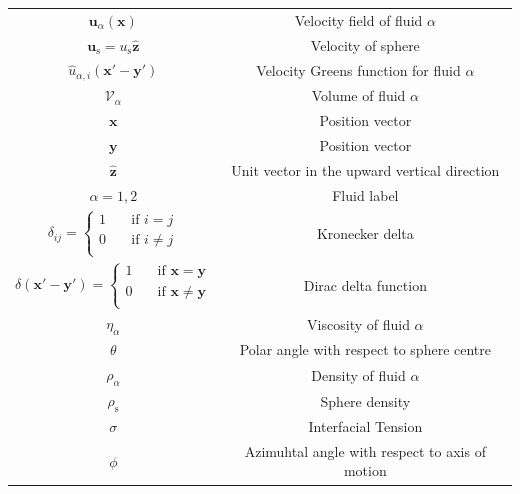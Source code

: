 \documentclass[12pt]{article}
\begin{document}
\begin{longtable}{|c|c|}
    $\mathbf{u}_{\alpha}(\mathbf{x})$                                   & Velocity field of fluid $\alpha$ \\
    $\mathbf{u}_{\text{s}} = u_{\text{s}} \mathbf{\hat{z}}$                & Velocity of sphere \\
    $\hat{u}_{\alpha,i}(\boldsymbol{x'} - \boldsymbol{y'})$              & Velocity Greens function for fluid $\alpha$ \\
    $\mathcal{V}_{\alpha}$                                              & Volume of fluid $\alpha$ \\
    $\mathbf{x}$                                                      & Position vector \\
    $\mathbf{y}$                                                      & Position vector \\
    $\mathbf{\hat{z}}$                                                & Unit vector in the upward vertical direction \\
    $\alpha = 1,2$                                                    & Fluid label \\
    $\delta_{ij} = \begin{cases}
    1  & \quad \text{if } i = j\\
    0  & \quad \text{if } i \neq j\\
  \end{cases}$                                                        & Kronecker delta \\
    $\delta(\boldsymbol{x'} - \boldsymbol{y'}) = \begin{cases}
    1  & \quad \text{if } \boldsymbol{x} = \boldsymbol{y}\\
    0  & \quad \text{if } \boldsymbol{x} \neq \boldsymbol{y}\\
  \end{cases}$                                                        & Dirac delta function \\
    $\eta_{\alpha}$                                                     & Viscosity of fluid $\alpha$ \\ 
    $\theta$                                                          & Polar angle with respect to sphere centre \\
    $\rho_{\alpha}$                                                     & Density of fluid $\alpha$   \\
    $\rho_{\text{s}}$                                                   & Sphere density          \\
    $\sigma$                                                          & Interfacial Tension     \\
    $\phi$                                                            & Azimuhtal angle with respect to axis of motion \\
    \hline %
  \end{longtable}
\end{document}
